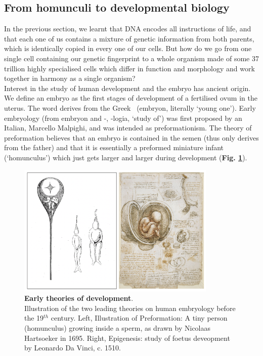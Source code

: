 \newpage

\subsection{From homunculi to developmental biology}
\label{sec:history_developmental_biology}

In the previous section, we learnt that DNA encodes all instructions of life, and that each one of us contains a mixture of genetic information from both parents, which is identically copied in every one of our cells.
But how do we go from one single cell containing our genetic fingerprint to a whole organism made of some 37 trillion highly specialised cells which differ in function and morphology and work together in harmony as a single organism?\\

Interest in the study of human development and the embryo has ancient origin.
We define an embryo as the first stages of development of a fertilised ovum in the uterus.
The word derives from the Greek \textepsilon\textmu\textbeta\textrho\textupsilon\textomikron\textnu \ (embryon, literally `young one').
Early embryology (from embryon and -\textlambda\textomikron\textgamma\textiota\textalpha, -logia, `study of') was first proposed by an Italian, Marcello Malpighi, and was intended as preformationism.
The theory of preformation believes that an embryo is contained in the semen (thus only derives from the father) and that it is essentially a preformed miniature infant (`homunculus') which just gets larger and larger during development (\textbf{Fig. \ref{fig:early_embryology}}).\\

\begin{figure}
\includegraphics[width=9.5cm]{Chapter1/Fig/Early_theories_development.png}
\caption[Early theories of development]{\textbf{Early theories of development}.\\
Illustration of the two leading theories on human embryology before the 19$^{th}$ century.
Left, Illustration of Preformation: 
A tiny person (homunculus) growing inside a sperm, as drawn by Nicolaas Hartsoeker in 1695.
Right, Epigenesis: study of foetus deveopment by Leonardo Da Vinci, c. 1510.}
\label{fig:early_embryology}
\end{figure}

